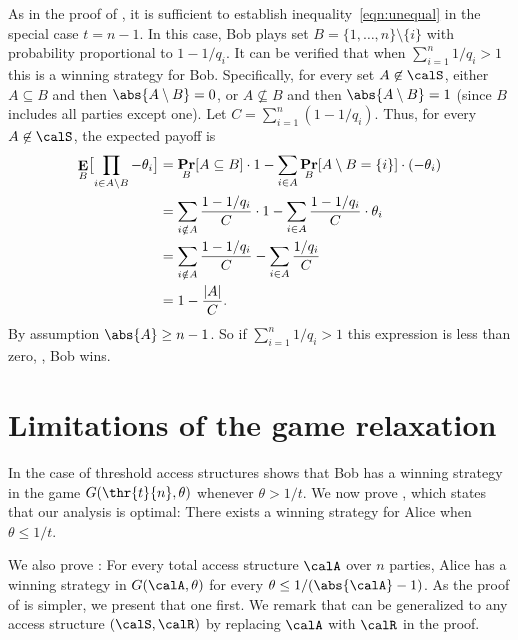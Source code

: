 \documentclass{toc}
\DeclareMathOperator\pr{\mathop{\bf Pr}}
\DeclareMathOperator\E{\mathop{\bf E}}
\begin{document}
As in the proof of , it is sufficient to establish inequality~\eqref{eqn:unequal} in the special case $t = n - 1$.  In this case, Bob plays set $B = \{1, \dots, n\}\setminus\{i\}$ with probability proportional to $1 - 1/q_i$.    It can be verified that when $\sum_{i=1}^n 1/q_i > 1$ this is a winning strategy for Bob.  
%
Specifically,   for every set $A \not\in \calS$, either $A \subseteq B$ and then $\abs{A\setminus B} = 0$, or $A\not\subseteq B$ and then $\abs{A\setminus B} = 1$ (since $B$ includes all parties except one).  Let $C=\sum_{i=1}^n (1 - 1/q_i)$.  Thus, for every $A\not\in \calS$, the expected payoff is 
\begin{align*}
\label{eqn:analysis_ave}
\E_B\bigl[\prod_{i \in A \setminus B} -\theta_i\bigr] 
&=  \pr_B[A \subseteq B] \cdot 1- \sum_{i\in A} \pr_B[A \setminus B = \{i\}]\cdot (-\theta_i) \notag \\
&= \sum_{i\notin A}\frac{1-1/q_i}{C}  \cdot  1- \sum_{i\in A}\frac{1-1/q_i}{C} \cdot \theta_i \notag \\
& =\sum_{i\notin A}\frac{1-1/q_i}{C}- \sum_{i\in A}\frac{1/q_i}{C} \\
&= 1 - \frac{|A|}{C}.
\end{align*}
By assumption $\abs{A} \geq n-1$. So if $\sum_{i=1}^n 1/q_i > 1$ this expression is less than zero, \ie, Bob wins.


\section{Limitations of the game relaxation}
\label{sec:limitation}

In the case of threshold access structures  shows that Bob
has a winning strategy in the game $G(\thr{t}{n}, \theta)$ whenever $\theta >
1/t$.  We now prove , which states that our analysis
is optimal:  There exists a winning strategy for Alice when $\theta \leq 1/t$.  

We also prove : For every total access structure $\calA$ over $n$ parties, Alice has a winning strategy in $G(\calA, \theta)$ for every $\theta \leq 1/(\abs{\calA}-1)$.  As the proof of  is simpler, we present that one first. We remark that 
 can be generalized to any
access structure $(\calS,\calR)$ by replacing $\calA$ with $\calR$ in the proof.
\end{document}
